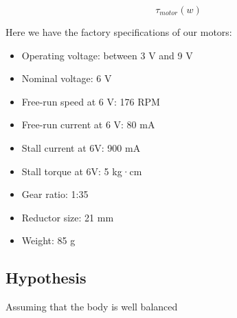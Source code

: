 \[\tau_{motor} (w) \]

Here we have the factory specifications of our motors: 
\begin{itemize}
    \item Operating voltage: between 3 V and 9 V
    \item Nominal voltage: 6 V
    \item Free-run speed at 6 V: 176 RPM
    \item Free-run current at 6 V: 80 mA
    \item Stall current at 6V: 900 mA
    \item Stall torque at 6V: 5 kg·cm
    \item Gear ratio: 1:35
    \item Reductor size: 21 mm
    \item Weight: 85 g
\end{itemize}


\subsection{Hypothesis}
Assuming that the body is well balanced
